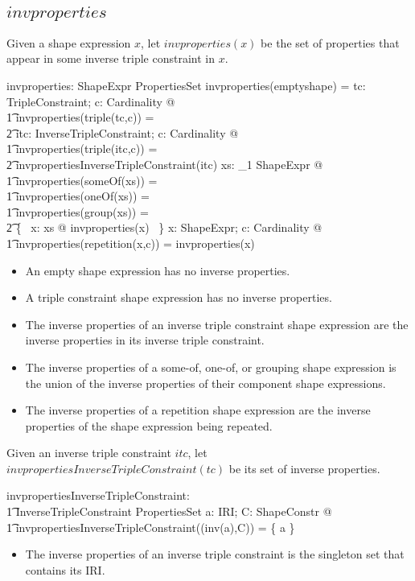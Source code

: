 \documentclass{article}
\begin{document}
\subsection{$invproperties$}

Given a shape expression $x$, let $invproperties(x)$ be the set of properties that appear in some 
inverse triple constraint in $x$.
\begin{axdef}
	invproperties: ShapeExpr \fun PropertiesSet
\where
	invproperties(emptyshape) = \emptyset
\also
	\forall tc: TripleConstraint; c: Cardinality @ \\
\t1		invproperties(triple(tc,c)) = \\
\t2			\emptyset
\also
	\forall itc: InverseTripleConstraint; c: Cardinality @ \\
\t1		invproperties(triple(itc,c)) = \\
\t2			invpropertiesInverseTripleConstraint(itc)
\also
	\forall xs: \seq_1 ShapeExpr @ \\
\t1		invproperties(someOf(xs)) = \\
\t1		invproperties(oneOf(xs)) = \\
\t1		invproperties(group(xs)) = \\
\t2			\bigcup \{~ x: \ran xs @ invproperties(x) ~\}
\also
	\forall x: ShapeExpr; c: Cardinality @ \\
\t1		invproperties(repetition(x,c)) = invproperties(x)
\end{axdef}
\begin{itemize}
\item An empty shape expression has no inverse properties.
\item A triple constraint shape expression has no inverse properties.
\item The inverse properties of an inverse triple constraint shape expression are the inverse properties in its inverse triple constraint.
\item The inverse properties of a some-of, one-of, or grouping shape expression is the union of the inverse properties of their
component shape expressions.
\item The inverse properties of a repetition shape expression are the inverse properties of the shape expression being repeated.
\end{itemize}

Given an inverse triple constraint $itc$, let $invpropertiesInverseTripleConstraint(tc)$ be its set of inverse properties.
\begin{axdef}
	invpropertiesInverseTripleConstraint: \\
\t1		InverseTripleConstraint \fun PropertiesSet
\where
	\forall a: IRI; C: ShapeConstr @ \\
\t1		invpropertiesInverseTripleConstraint((inv(a),C)) = \{ a \}
\end{axdef}
\begin{itemize}
\item The inverse properties of an inverse triple constraint is the singleton set that contains its IRI.
\end{itemize}
\end{document}
